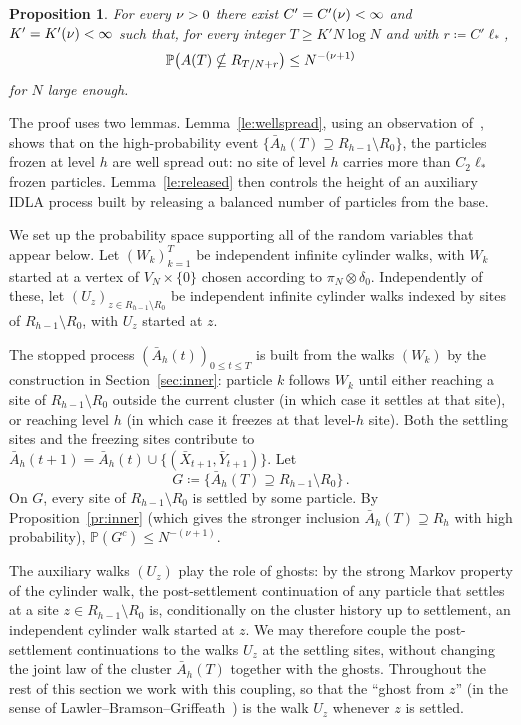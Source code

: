 \documentclass[11pt,a4paper,reqno]{amsart}
\newtheorem{Proposition}[Theorem]{Proposition}
\theoremstyle{definition}
\newcommand{\bbP}{{\ensuremath{\mathbb P}} }
\begin{document}
\begin{Proposition}\label{pr:outer}
For every $\nu > 0$ there exist $C' = C'(\nu) < \infty$ and $K' = K'(\nu) < \infty$ such that, for every integer $T \geq K' N \log N$ and with $r \coloneqq C' \ell_*$,
	\[ \bbP \big( A(T) \nsubseteq R_{T/N + r} \big) \leq N^{-(\n+1)} \]
for $N$ large enough.
\end{Proposition}

The proof uses two lemmas. Lemma~\ref{le:wellspread}, using an observation of~\cite{asselah2025internal}, shows that on the high-probability event $\{\bar A_h(T) \supseteq R_{h-1}\setminus R_0\}$, the particles frozen at level $h$ are well spread out: no site of level $h$ carries more than $C_2 \ell_*$ frozen particles. Lemma~\ref{le:released} then controls the height of an auxiliary IDLA process built by releasing a balanced number of particles from the base.

We set up the probability space supporting all of the random variables that appear below. Let $(W_k)_{k=1}^T$ be independent infinite cylinder walks, with $W_k$ started at a vertex of $V_N \times \{0\}$ chosen according to $\pi_N \otimes \delta_0$. Independently of these, let $(U_z)_{z \in R_{h-1}\setminus R_0}$ be independent infinite cylinder walks indexed by sites of $R_{h-1} \setminus R_0$, with $U_z$ started at $z$.

The stopped process $(\bar A_h(t))_{0 \leq t \leq T}$ is built from the walks $(W_k)$ by the construction in Section~\ref{sec:inner}: particle $k$ follows $W_k$ until either reaching a site of $R_{h-1} \setminus R_0$ outside the current cluster (in which case it settles at that site), or reaching level $h$ (in which case it freezes at that level-$h$ site). Both the settling sites and the freezing sites contribute to $\bar A_h(t+1) = \bar A_h(t) \cup \{(\bar X_{t+1}, \bar Y_{t+1})\}$. Let
\[
  G \coloneqq \{\bar A_h(T) \supseteq R_{h-1} \setminus R_0\}\,.
\]
On $G$, every site of $R_{h-1}\setminus R_0$ is settled by some particle. By Proposition~\ref{pr:inner} (which gives the stronger inclusion $\bar A_h(T) \supseteq R_h$ with high probability), $\bbP(G^c) \leq N^{-(\nu+1)}$.

The auxiliary walks $(U_z)$ play the role of ghosts: by the strong Markov property of the cylinder walk, the post-settlement continuation of any particle that settles at a site $z \in R_{h-1}\setminus R_0$ is, conditionally on the cluster history up to settlement, an independent cylinder walk started at $z$. We may therefore couple the post-settlement continuations to the walks $U_z$ at the settling sites, without changing the joint law of the cluster $\bar A_h(T)$ together with the ghosts. Throughout the rest of this section we work with this coupling, so that the ``ghost from $z$'' (in the sense of Lawler--Bramson--Griffeath~\cite{lawler1992internal}) is the walk $U_z$ whenever $z$ is settled.
\end{document}
